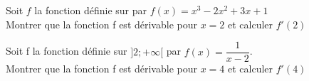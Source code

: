 \documentclass[12pt,a4paper]{article}  %
\begin{document}

Soit $f$ la fonction définie sur \R par $f(x)=x^3-2 x^2+3 x+1$\\
Montrer que la fonction f est dérivable pour $x=2$ et calculer $f'(2)$

Soit f la fonction définie sur $] 2 ;+\infty[$ par $f(x)=\dfrac{1}{x-2}$.\\
Montrer que la fonction f est dérivable pour $x=4$ et calculer $f'(4)$

%
%
\end{document}
